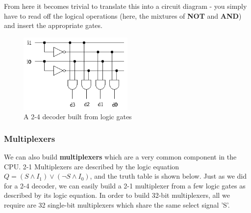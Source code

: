 \documentclass{article}
\begin{document}
	From here it becomes trivial to translate this into a circuit diagram - you simply have to read off the logical operations (here, the mixtures of \textbf{NOT} and \textbf{AND}) and insert the appropriate gates.
	\begin{figure}[h]
		\centering
		\includegraphics[width=0.5\textwidth]{2_4_decoder}
		\caption{A 2-4 decoder built from logic gates}
		\label{fig:2 4 decoder}
	\end{figure}
	
	\subsubsection{Multiplexers}
	We can also build \textbf{multiplexers} which are a very common component in the CPU. 2-1 Multiplexers are described by the logic equation $Q = (S \wedge I_{1}) \vee (\neg S \wedge I_{0})$, and the truth table is shown below.	Just as we did for a 2-4 decoder, we can easily build a 2-1 multiplexer from a few logic gates as described by its logic equation. In order to build 32-bit multiplexers, all we require are 32 single-bit multiplexers which share the same select signal 'S'.
	
\end{document}
